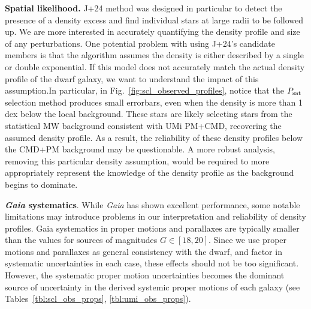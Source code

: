 \textbf{Spatial likelihood.} J+24 method was designed in particular to
detect the presence of a density excess and find individual stars at
large radii to be followed up. We are more interested in accurately
quantifying the density profile and size of any perturbations. One
potential problem with using J+24's candidate members is that the
algorithm assumes the density is either described by a single or double
exponential. If this model does not accurately match the actual density
profile of the dwarf galaxy, we want to understand the impact of this
assumption.In particular, in Fig.~\ref{fig:scl_observed_profiles},
notice that the \(P_{\rm sat}\) selection method produces small
errorbars, even when the density is more than 1 dex below the local
background. These stars are likely selecting stars from the statistical
MW background consistent with UMi PM+CMD, recovering the assumed density
profile. As a result, the reliability of these density profiles below
the CMD+PM background may be questionable. A more robust analysis,
removing this particular density assumption, would be required to more
appropriately represent the knowledge of the density profile as the
background begins to dominate.

\textbf{\emph{Gaia} systematics}. While \emph{Gaia} has shown excellent
performance, some notable limitations may introduce problems in our
interpretation and reliability of density profiles. Gaia systematics in
proper motions and parallaxes are typically smaller than the values for
sources of magnitudes \(G\in[18,20]\). Since we use proper motions and
parallaxes as general consistency with the dwarf, and factor in
systematic uncertainties in each case, these effects should not be too
significant. However, the systematic proper motion uncertainties becomes
the dominant source of uncertainty in the derived systemic proper
motions of each galaxy (see
Tables~\ref{tbl:scl_obs_props}, \ref{tbl:umi_obs_props}).

